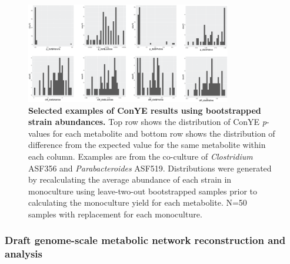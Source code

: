 \documentclass[11pt,twocolumn,notitlepage,openany,twoside]{book}
\begin{document}
\begin{refsection}
\begin{figure}[tb]
\centering
\includegraphics[width=0.8\textwidth]{ch2_figS4}
\caption[Selected examples of ConYE results using bootstrapped strain abundances.]{\textbf{Selected examples of ConYE results using bootstrapped strain abundances.} Top row shows the distribution of ConYE \textit{p}-values for each metabolite and bottom row shows the distribution of difference from the expected value for the same metabolite within each column. Examples are from the co-culture of \textit{Clostridium} ASF356 and \textit{Parabacteroides} ASF519. Distributions were generated by recalculating the average abundance of each strain in monoculture using leave-two-out bootstrapped samples prior to calculating the monoculture yield for each metabolite. N=50 samples with replacement for each monoculture.}
\end{figure}

\subsubsection{Draft genome-scale metabolic network reconstruction and analysis}


\end{refsection}
\end{document}
